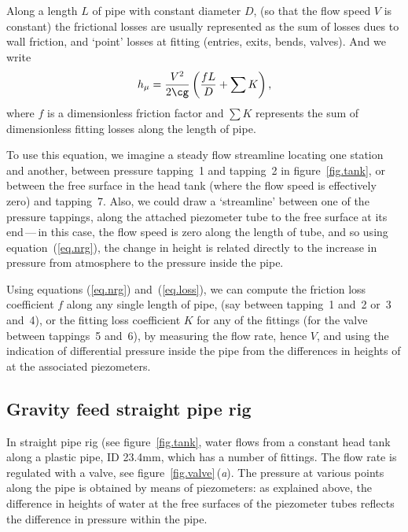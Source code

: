 \documentclass[a4paper,11pt]{article} \pagestyle{plain}
\begin{document}
Along a length $L$ of pipe with constant diameter $D$, (so that the
flow speed $V$ is constant) the frictional losses are usually
represented as the sum of losses dues to wall friction, and `point'
losses at fitting (entries, exits, bends, valves). And we write
\begin{equation}
h_\mu = \frac{V^2}{2\cg}\left(\frac{fL}{D}+\sum K\right),
\label{eq.loss}
\end{equation}
where $f$ is a dimensionless friction factor and $\sum K$ represents
the sum of dimensionless fitting losses along the length of pipe.

To use this equation, we imagine a steady flow streamline locating one
station and another, \eg between pressure tapping~1 and tapping~2 in
figure~\ref{fig.tank}, or between the free surface in the head tank
(where the flow speed is effectively zero) and tapping~7. Also, we
could draw a `streamline' between one of the pressure tappings, along
the attached piezometer tube to the free surface at its end\,---\,in
this case, the flow speed is zero along the length of tube, and so
using equation~(\ref{eq.nrg}), the change in height is related
directly to the increase in pressure from atmosphere to the pressure
inside the pipe.

Using equations (\ref{eq.nrg}) and~(\ref{eq.loss}), we can compute the
friction loss coefficient $f$ along any single length of pipe, (say
between tapping~1 and~2 or~3 and~4), or the fitting loss coefficient
$K$ for any of the fittings (\eg for the valve between tappings~5
and~6), by measuring the flow rate, hence $V$, and using the
indication of differential pressure inside the pipe from the
differences in heights of at the associated piezometers.

\subsection*{Gravity feed straight pipe rig}

In straight pipe rig (see figure~\ref{fig.tank}, water flows from a
constant head tank along a plastic pipe, ID 23.4mm, which has a number
of fittings. The flow rate is regulated with a valve, see
figure~\ref{fig.valve}\,(\textit{a}). The pressure at various points
along the pipe is obtained by means of piezometers: as explained
above, the difference in heights of water at the free surfaces of the
piezometer tubes reflects the difference in pressure within the pipe.
\end{document}
